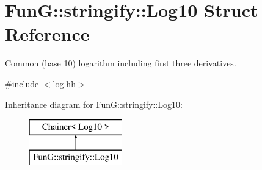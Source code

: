 \hypertarget{structFunG_1_1stringify_1_1Log10}{\section{Fun\-G\-:\-:stringify\-:\-:Log10 Struct Reference}
\label{structFunG_1_1stringify_1_1Log10}
}


Common (base 10) logarithm including first three derivatives.  




{\ttfamily \#include $<$log.\-hh$>$}

Inheritance diagram for Fun\-G\-:\-:stringify\-:\-:Log10\-:\begin{figure}[H]
\begin{center}
\leavevmode
\includegraphics[height=2.000000cm]{structFunG_1_1stringify_1_1Log10}
\end{center}
\end{figure}
